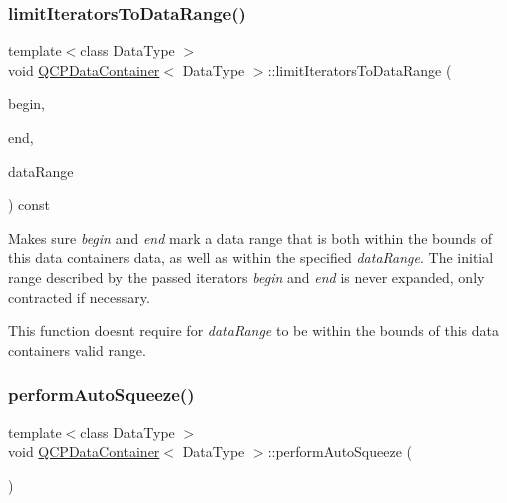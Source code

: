 \subsubsection{\texorpdfstring{limitIteratorsToDataRange()}{limitIteratorsToDataRange()}}
{\footnotesize\ttfamily template$<$class Data\+Type $>$ \\
void \mbox{\hyperlink{class_q_c_p_data_container}{Q\+C\+P\+Data\+Container}}$<$ Data\+Type $>$\+::limit\+Iterators\+To\+Data\+Range (\begin{DoxyParamCaption}\item[{\mbox{\hyperlink{class_q_c_p_data_container_ae40a91f5cb0bcac61d727427449b7d15}{const\+\_\+iterator}} \&}]{begin,  }\item[{\mbox{\hyperlink{class_q_c_p_data_container_ae40a91f5cb0bcac61d727427449b7d15}{const\+\_\+iterator}} \&}]{end,  }\item[{const \mbox{\hyperlink{class_q_c_p_data_range}{Q\+C\+P\+Data\+Range}} \&}]{data\+Range }\end{DoxyParamCaption}) const}

Makes sure {\itshape begin} and {\itshape end} mark a data range that is both within the bounds of this data container\textquotesingle{}s data, as well as within the specified {\itshape data\+Range}. The initial range described by the passed iterators {\itshape begin} and {\itshape end} is never expanded, only contracted if necessary.

This function doesn\textquotesingle{}t require for {\itshape data\+Range} to be within the bounds of this data container\textquotesingle{}s valid range. \mbox{\label{class_q_c_p_data_container_a83c25ac14be1c920df85e797ee75c982}} 
\subsubsection{\texorpdfstring{performAutoSqueeze()}{performAutoSqueeze()}}
{\footnotesize\ttfamily template$<$class Data\+Type $>$ \\
void \mbox{\hyperlink{class_q_c_p_data_container}{Q\+C\+P\+Data\+Container}}$<$ Data\+Type $>$\+::perform\+Auto\+Squeeze (\begin{DoxyParamCaption}{ }\end{DoxyParamCaption})\hspace{0.3cm}{\ttfamily [protected]}}

